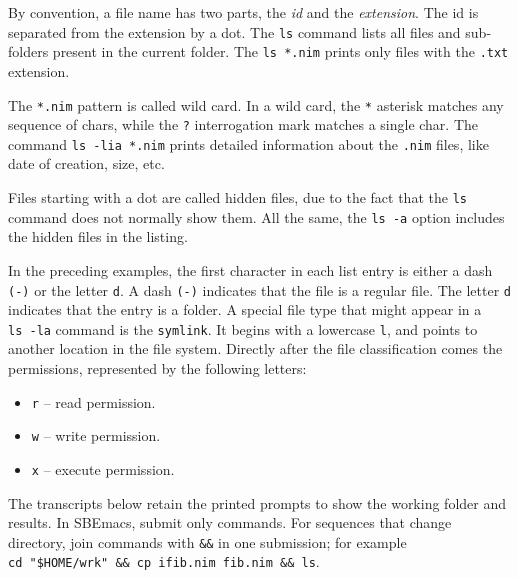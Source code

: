 \documentclass[
  12pt,
]{book}
\newenvironment{Shaded}{}{}
\newcommand{\AttributeTok}[1]{\textcolor[rgb]{0.49,0.56,0.16}{#1}}
\newcommand{\ExtensionTok}[1]{#1}
\newcommand{\NormalTok}[1]{#1}
\newcommand{\PreprocessorTok}[1]{\textcolor[rgb]{0.74,0.48,0.00}{#1}}
\providecommand{\tightlist}{%
  \setlength{\itemsep}{0pt}\setlength{\parskip}{0pt}}
\begin{document}
By convention, a file name has two parts, the \emph{id} and the
\emph{extension}. The id is separated from the extension by a dot. The
\texttt{ls} command lists all files and sub-folders present in the
current folder. The \texttt{ls\ *.nim} prints only files with the
\texttt{.txt} extension.

The \texttt{*.nim} pattern is called wild card. In a wild card, the
\texttt{*} asterisk matches any sequence of chars, while the \texttt{?}
interrogation mark matches a single char. The command
\texttt{ls\ -lia\ *.nim} prints detailed information about the
\texttt{.nim} files, like date of creation, size, etc.

\begin{Shaded}
\end{Shaded}

Files starting with a dot are called hidden files, due to the fact that
the \texttt{ls} command does not normally show them. All the same, the
\texttt{ls\ -a} option includes the hidden files in the listing.

In the preceding examples, the first character in each list entry is
either a dash \texttt{(-)} or the letter \texttt{d}. A dash \texttt{(-)}
indicates that the file is a regular file. The letter \texttt{d}
indicates that the entry is a folder. A special file type that might
appear in a \texttt{ls\ -la} command is the \texttt{symlink}. It begins
with a lowercase \texttt{l}, and points to another location in the file
system. Directly after the file classification comes the permissions,
represented by the following letters:

\begin{itemize}
\tightlist
\item
  \texttt{r} -- read permission.
\item
  \texttt{w} -- write permission.
\item
  \texttt{x} -- execute permission.
\end{itemize}

The transcripts below retain the printed prompts to show the working
folder and results. In SBEmacs, submit only commands. For sequences that
change directory, join commands with \texttt{\&\&} in one submission;
for example
\texttt{cd\ "\$HOME/wrk"\ \&\&\ cp\ ifib.nim\ fib.nim\ \&\&\ ls}.
\end{document}
